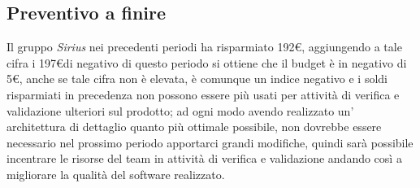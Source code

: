 \subsection{Preventivo a finire}
Il gruppo \emph{Sirius} nei precedenti periodi ha risparmiato 192\euro , aggiungendo a tale cifra i 197\euro di negativo di questo periodo si ottiene che il budget è in negativo di 5\euro , anche se tale cifra non è elevata, è comunque un indice negativo e i soldi risparmiati in precedenza non possono essere più usati per attività di verifica e validazione ulteriori sul prodotto; ad ogni modo avendo realizzato un' architettura di dettaglio quanto più ottimale possibile, non dovrebbe essere necessario nel prossimo periodo apportarci grandi modifiche, quindi sarà possibile incentrare le risorse del team in attività di verifica e validazione andando così a migliorare la qualità del software realizzato.